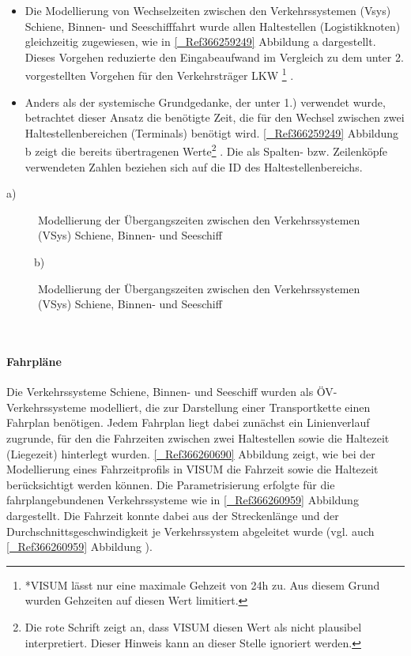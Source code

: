 \begin{itemize}
%
   \item Die Modellierung von Wechselzeiten zwischen den Verkehrssystemen (Vsys) Schiene, Binnen- und Seeschifffahrt wurde allen Haltestellen (Logistikknoten) gleichzeitig zugewiesen, wie in \autoref{_Ref366259249} Abbildung a dargestellt. Dieses Vorgehen reduzierte den Eingabeaufwand im Vergleich zu dem unter 2. vorgestellten Vorgehen für den Verkehrsträger LKW
\label{_Ref366441961}\footnote{%
 *VISUM lässt nur eine maximale Gehzeit von 24h zu. Aus diesem Grund wurden Gehzeiten auf diesen Wert limitiert.
}%
.
   \item Anders als der systemische Grundgedanke, der unter 1.) verwendet wurde, betrachtet dieser Ansatz die benötigte Zeit, die für den Wechsel zwischen zwei Haltestellenbereichen (Terminals) benötigt wird. \autoref{_Ref366259249} Abbildung b zeigt die bereits übertragenen Werte\footnote{%
 Die rote Schrift zeigt an, dass VISUM diesen Wert als nicht plausibel interpretiert. Dieser Hinweis kann an dieser Stelle ignoriert werden.
}%
. Die als Spalten- bzw. Zeilenköpfe verwendeten Zahlen beziehen sich auf die ID des Haltestellenbereichs.
%
\end{itemize}
a) 
\begin{figure}[htbp]
  \centering
  \caption{ Modellierung der Übergangszeiten zwischen den Verkehrssystemen (VSys) Schiene, Binnen- und Seeschiff}
  \label{_Ref366259249}
\end{figure}
~~~~~b) 
\begin{figure}[htbp]
  \centering
  \caption{ Modellierung der Übergangszeiten zwischen den Verkehrssystemen (VSys) Schiene, Binnen- und Seeschiff}
  \label{_Ref366259249}
\end{figure}
~\\


% 
\paragraph{Fahrpläne}
Die Verkehrssysteme Schiene, Binnen- und Seeschiff wurden als ÖV-Verkehrssysteme modelliert, die zur Darstellung einer Transportkette einen Fahrplan benötigen. Jedem Fahrplan liegt dabei zunächst ein Linienverlauf zugrunde, für den die Fahrzeiten zwischen zwei Haltestellen sowie die Haltezeit (Liegezeit) hinterlegt wurden. \autoref{_Ref366260690} Abbildung  zeigt, wie bei der Modellierung eines Fahrzeitprofils in VISUM die Fahrzeit sowie die Haltezeit berücksichtigt werden können. Die Parametrisierung erfolgte für die fahrplangebundenen Verkehrssysteme wie in \autoref{_Ref366260959} Abbildung  dargestellt. Die Fahrzeit konnte dabei aus der Streckenlänge und der Durchschnittsgeschwindigkeit je Verkehrssystem abgeleitet wurde (vgl. auch \autoref{_Ref366260959} Abbildung ).~\\

